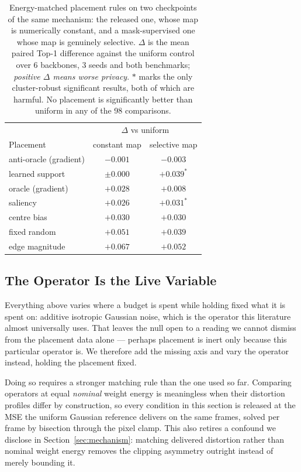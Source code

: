 \documentclass[10pt,journal]{IEEEtran}
\begin{document}
\begin{table}[t]
\centering
\caption{Energy-matched placement rules on two checkpoints of the same mechanism: the released one, whose map is numerically constant, and a mask-supervised one whose map is genuinely selective. $\Delta$ is the mean paired Top-1 difference against the uniform control over 6 backbones, 3 seeds and both benchmarks; \emph{positive $\Delta$ means worse privacy}. $\ast$ marks the only cluster-robust significant results, both of which are harmful. No placement is significantly better than uniform in any of the 98 comparisons.}
\label{tab:placement}
\begin{tabular}{lcc}
\hline
 & \multicolumn{2}{c}{$\Delta$ vs uniform} \\
Placement & constant map & selective map \\
\hline
anti-oracle (gradient) & $-0.001$ & $-0.003$ \\
learned support        & $\pm0.000$ & $+0.039^{\ast}$ \\
oracle (gradient)      & $+0.028$ & $+0.008$ \\
saliency               & $+0.026$ & $+0.031^{\ast}$ \\
centre bias            & $+0.030$ & $+0.030$ \\
fixed random           & $+0.051$ & $+0.039$ \\
edge magnitude         & $+0.067$ & $+0.052$ \\
\hline
\end{tabular}
\end{table}

\subsection{The Operator Is the Live Variable}
\label{sec:operator}

Everything above varies where a budget is spent while holding fixed what it is
spent on: additive isotropic Gaussian noise, which is the operator this
literature almost universally uses. That leaves the null open to a reading we
cannot dismiss from the placement data alone --- perhaps placement is inert
only because this particular operator is. We therefore add the missing axis
and vary the operator instead, holding the placement fixed.

Doing so requires a stronger matching rule than the one used so far.
Comparing operators at equal \emph{nominal} weight energy is meaningless when
their distortion profiles differ by construction, so every condition in this
section is released at the MSE the uniform Gaussian reference delivers on the
same frames, solved per frame by bisection through the pixel clamp. This also
retires a confound we disclose in Section~\ref{sec:mechanism}: matching
delivered distortion rather than nominal weight energy removes the clipping
asymmetry outright instead of merely bounding it.
\end{document}
